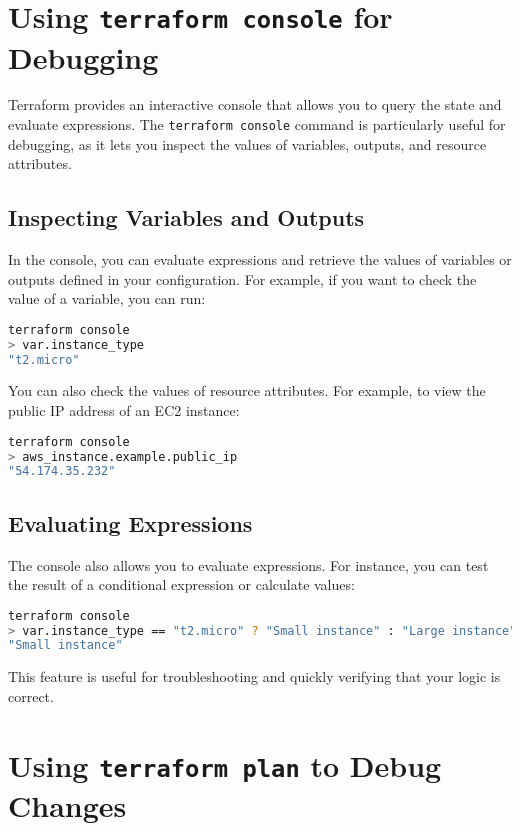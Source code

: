 \section{Using \texttt{terraform console} for Debugging}

Terraform provides an interactive console that allows you to query the state and evaluate expressions. The \texttt{terraform console} command is particularly useful for debugging, as it lets you inspect the values of variables, outputs, and resource attributes.

\subsection{Inspecting Variables and Outputs}

In the console, you can evaluate expressions and retrieve the values of variables or outputs defined in your configuration. For example, if you want to check the value of a variable, you can run:

\begin{lstlisting}[language=bash]
terraform console
> var.instance_type
"t2.micro"
\end{lstlisting}

You can also check the values of resource attributes. For example, to view the public IP address of an EC2 instance:

\begin{lstlisting}[language=bash]
terraform console
> aws_instance.example.public_ip
"54.174.35.232"
\end{lstlisting}

\subsection{Evaluating Expressions}

The console also allows you to evaluate expressions. For instance, you can test the result of a conditional expression or calculate values:

\begin{lstlisting}[language=bash]
terraform console
> var.instance_type == "t2.micro" ? "Small instance" : "Large instance"
"Small instance"
\end{lstlisting}

This feature is useful for troubleshooting and quickly verifying that your logic is correct.

\section{Using \texttt{terraform plan} to Debug Changes}

